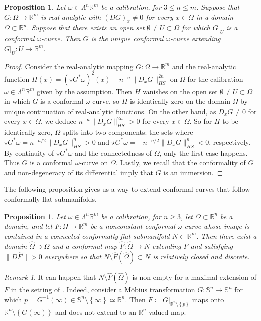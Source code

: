 \documentclass[a4paper,leqno,11pt]{amsart}
\numberwithin{equation}{section}
\newtheorem{proposition}[theorem]{Proposition}
\theoremstyle{remark}
\newtheorem{remark}[theorem]{Remark}
\theoremstyle{remark}
\renewcommand{\S}{\mathbb{S}}
\newcommand{\R}{\mathbb{R}}
\begin{document}
\begin{proposition}
\label{cor:uniquecont}
Let $\omega \in \Lambda^{n}\mathbb{R}^m$ be a calibration, for $3\le n \le m$. Suppose that $G \colon \Omega \to \R^m$ is real-analytic with $( DG )_x \neq 0$ for every $x \in \Omega$ in a domain $\Omega \subset  \mathbb{R}^n$. Suppose that there exists an open set $\emptyset \neq U \subset \Omega$ for which $G|_{U}$ is a conformal $\omega$-curve. Then $G$ is the unique conformal $\omega$-curve extending $G|_U \colon U \to \R^m$.
\end{proposition}

\begin{proof}
Consider the real-analytic mapping $G \colon \Omega \to \mathbb{R}^m$ and the real-analytic function $H(x) = ( \star G^{*}\omega )^2(x) - n^{-n} \|D_xG\|_{HS}^{2n}$ on $\Omega$ for the calibration $\omega \in \Lambda^n \mathbb{R}^m$ given by the assumption. Then $H$ vanishes on the open set $\emptyset \neq U \subset \Omega$ in which $G$ is a conformal $\omega$-curve, so $H$ is identically zero on the domain $\Omega$ by unique continuation of real-analytic functions. On the other hand, as $D_xG \neq 0$ for every $x \in \Omega$, we deduce $n^{-n}\|D_xG\|^{2n}_{HS} > 0$ for every $x \in \Omega$. So for $H$ to be identically zero, $\Omega$ splits into two components: the sets where $\star G^{*}\omega = n^{ -n/2 }\|D_xG\|^{n}_{HS} > 0$ and $\star G^{*}\omega = - n^{ -n/2 }\|D_xG\|^{n}_{HS} < 0$, respectively. By continuity of $\star G^{*}\omega$ and the connectedness of $\Omega$, only the first case happens. Thus $G$ is a conformal $\omega$-curve on $\Omega$. Lastly, we recall that the conformality of $G$ and non-degeneracy of its differential imply that $G$ is an immersion.
\end{proof}

The following proposition gives us a way to extend conformal curves that follow conformally flat submanifolds.
\begin{proposition}\label{prop:extensionresult:toamanifold}
Let $\omega \in \Lambda^n \R^m$ be a calibration, for $n \geq 3$, let $\Omega\subset \R^n$ be a domain, and let $F\colon \Omega \to \R^m$ be a nonconstant conformal $\omega$-curve whose image is contained in a connected conformally flat submanifold $N \subset \R^m$. Then there exist a domain $\hat \Omega \supset \Omega$ and a conformal map $\hat F \colon \hat \Omega \to N$ extending $F$ and satisfying $\| D\hat F \| > 0$ everywhere so that $N \setminus \hat F( \hat \Omega ) \subset N$ is relatively closed and discrete.
\end{proposition}
\begin{remark}
It can happen that $N \setminus \hat F( \hat \Omega )$ is non-empty for a maximal extension of $F$ in the setting of . Indeed, consider a Möbius transformation $G \colon \S^n \to \S^n$ for which $p = G^{-1}( \infty ) \in \S^n \setminus \left\{\infty\right\} \simeq \R^n$. Then $F \coloneqq G|_{ \mathbb{R}^n \setminus \left\{p\right\} }$ maps onto $\mathbb{R}^n \setminus \left\{ G( \infty ) \right\}$ and does not extend to an $\R^n$-valued map.
\end{remark}
\end{document}
